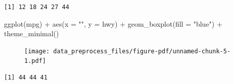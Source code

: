 \documentclass[
  letterpaper,
  DIV=11,
  numbers=noendperiod]{scrreprt}
\newenvironment{Shaded}{\begin{snugshade}}{\end{snugshade}}
\newcommand{\AttributeTok}[1]{\textcolor[rgb]{0.40,0.45,0.13}{#1}}
\newcommand{\CommentTok}[1]{\textcolor[rgb]{0.37,0.37,0.37}{#1}}
\newcommand{\FunctionTok}[1]{\textcolor[rgb]{0.28,0.35,0.67}{#1}}
\newcommand{\NormalTok}[1]{\textcolor[rgb]{0.00,0.23,0.31}{#1}}
\newcommand{\OtherTok}[1]{\textcolor[rgb]{0.00,0.23,0.31}{#1}}
\newcommand{\SpecialCharTok}[1]{\textcolor[rgb]{0.37,0.37,0.37}{#1}}
\newcommand{\StringTok}[1]{\textcolor[rgb]{0.13,0.47,0.30}{#1}}
\begin{document}
\begin{Shaded}
\end{Shaded}

\begin{verbatim}
[1] 12 18 24 27 44
\end{verbatim}

\begin{Shaded}
\begin{Highlighting}[]
\FunctionTok{ggplot}\NormalTok{(mpg) }\SpecialCharTok{+}
  \FunctionTok{aes}\NormalTok{(}\AttributeTok{x =} \StringTok{""}\NormalTok{, }\AttributeTok{y =}\NormalTok{ hwy) }\SpecialCharTok{+}
  \FunctionTok{geom\_boxplot}\NormalTok{(}\AttributeTok{fill =} \StringTok{"blue"}\NormalTok{) }\SpecialCharTok{+}
  \FunctionTok{theme\_minimal}\NormalTok{()}
\end{Highlighting}
\end{Shaded}

\begin{figure}[H]

{\centering \texttt{[image: data\_preprocess\_files/figure-pdf/unnamed-chunk-5-1.pdf]}

}

\end{figure}

\begin{Shaded}
\end{Shaded}

\begin{verbatim}
[1] 44 44 41
\end{verbatim}

\begin{Shaded}
\end{Shaded}
\end{document}
